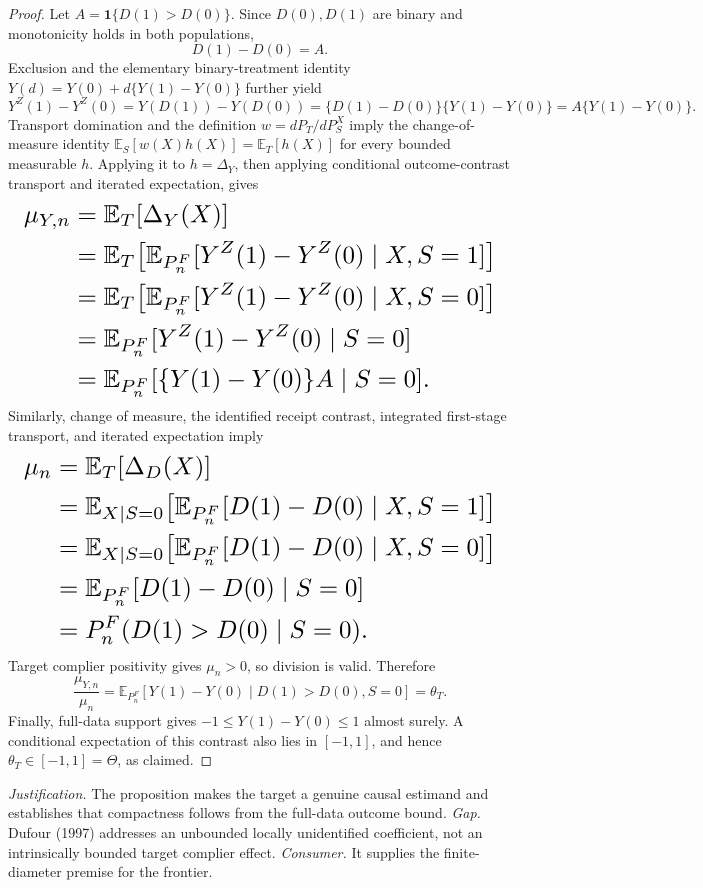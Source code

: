 \documentclass{article}
\begin{document}
\begin{proof}
Let \(A=\mathbf 1\{D(1)>D(0)\}\). Since \(D(0),D(1)\) are binary and monotonicity holds in both populations,
\[
D(1)-D(0)=A.
\]
Exclusion and the elementary binary-treatment identity \(Y(d)=Y(0)+d\{Y(1)-Y(0)\}\) further yield
\[
Y^Z(1)-Y^Z(0)
 =Y(D(1))-Y(D(0))
 =\{D(1)-D(0)\}\{Y(1)-Y(0)\}
 =A\{Y(1)-Y(0)\}.
\]
Transport domination and the definition \(w=dP_T/dP_S^X\) imply the change-of-measure identity \(\mathbb E_S[w(X)h(X)]=\mathbb E_T[h(X)]\) for every bounded measurable \(h\). Applying it to \(h=\Delta_Y\), then applying conditional outcome-contrast transport and iterated expectation, gives
\[
\makebox[\linewidth][c]{\resizebox{0.98\linewidth}{!}{\(\displaystyle \begin{aligned}
\mu_{Y,n}
&=\mathbb E_T[\Delta_Y(X)]\\
&=\mathbb E_T\!\left[\mathbb E_{P_n^F}[Y^Z(1)-Y^Z(0)\mid X,S=1]\right]\\
&=\mathbb E_T\!\left[\mathbb E_{P_n^F}[Y^Z(1)-Y^Z(0)\mid X,S=0]\right]\\
&=\mathbb E_{P_n^F}[Y^Z(1)-Y^Z(0)\mid S=0]\\
&=\mathbb E_{P_n^F}[\{Y(1)-Y(0)\}A\mid S=0].
\end{aligned}\)}}
\]
Similarly, change of measure, the identified receipt contrast, integrated first-stage transport, and iterated expectation imply
\[
\makebox[\linewidth][c]{\resizebox{0.98\linewidth}{!}{\(\displaystyle \begin{aligned}
\mu_n
&=\mathbb E_T[\Delta_D(X)]\\
&=\mathbb E_{X\mid S=0}\!\left[\mathbb E_{P_n^F}[D(1)-D(0)\mid X,S=1]\right]\\
&=\mathbb E_{X\mid S=0}\!\left[\mathbb E_{P_n^F}[D(1)-D(0)\mid X,S=0]\right]\\
&=\mathbb E_{P_n^F}[D(1)-D(0)\mid S=0]\\
&=P_n^F(D(1)>D(0)\mid S=0).
\end{aligned}\)}}
\]
Target complier positivity gives \(\mu_n>0\), so division is valid. Therefore
\[
\frac{\mu_{Y,n}}{\mu_n}
=\mathbb E_{P_n^F}[Y(1)-Y(0)\mid D(1)>D(0),S=0]
=\theta_T.
\]
Finally, full-data support gives \(-1\le Y(1)-Y(0)\le1\) almost surely. A conditional expectation of this contrast also lies in \([-1,1]\), and hence \(\theta_T\in[-1,1]=\Theta\), as claimed.
\end{proof}
\par\smallskip\noindent \textit{Justification.} The proposition makes the target a genuine causal estimand and establishes that compactness follows from the full-data outcome bound. \textit{Gap.} Dufour (1997) addresses an unbounded locally unidentified coefficient, not an intrinsically bounded target complier effect. \textit{Consumer.} It supplies the finite-diameter premise for the frontier.
\end{document}
